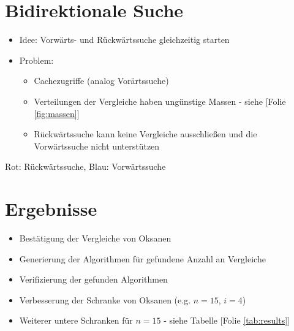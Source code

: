 \section{Bidirektionale Suche}
\sectionframe{\insertsection}
\begin{frame}{\insertsection}

  \begin{itemize}
    \item<+-> Idee: Vorwärts- und Rückwärtssuche gleichzeitig starten
    \item<+-> Problem:
      \begin{itemize}
        \item<+-> Cachezugriffe (analog Vorärtssuche)
        \item<+-> Verteilungen der Vergleiche haben ungünstige Massen - siehe [Folie \ref{fig:massen}]
        \item<+-> Rückwärtssuche kann keine Vergleiche ausschließen und die Vorwärtssuche nicht unterstützen
      \end{itemize}
  \end{itemize}
\end{frame}

\begin{frame}{\insertsection}
  \begin{figure}[!b]
    \centering
    \renewcommand{\arraystretch}{0.9}
    \resizebox{0.85\textheight}{!}{%
      
      \label{fig:massen}
    }
  \end{figure}

  {\color{red} Rot: Rückwärtssuche},
  {\color{blue} Blau: Vorwärtssuche}

\end{frame}


\section{Ergebnisse}

\begin{frame}{\insertsection}
  \begin{itemize}
    \item<+-> Bestätigung der Vergleiche von Oksanen
    \item<+-> Generierung der Algorithmen für gefundene Anzahl an Vergleiche
    \item<+-> Verifizierung der gefunden Algorithmen
    \item<+-> Verbesserung der Schranke von Oksanen (e.g. $n=15$, $i=4$)
    \item<+-> Weiterer untere Schranken für $n=15$ - siehe Tabelle [Folie \ref{tab:results}]
  \end{itemize}


\end{frame}

